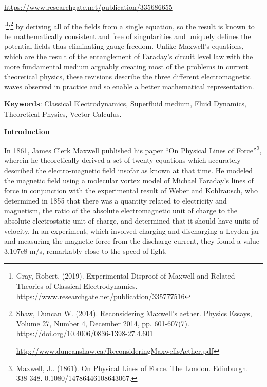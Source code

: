 \documentclass[a4paper]{article}
\newcommand\textstyleInternetlink[1]{#1}
\begin{document}
{{\url{https://www.researchgate.net/publication/335686655}  \par
}{\textsuperscript{,}}\footnote{ Gray, Robert. (2019). Experimental
Disproof of Maxwell and Related Theories of Classical Electrodynamics.
\url{https://www.researchgate.net/publication/335777516}\textstyleInternetlink{ }\par \textstyleInternetlink{
}}{\textsuperscript{,}}\footnote{ 
\href{https://www.ingentaconnect.com/search;jsessionid=9s75nnff84d8s.x-ic-live-02?option2=author&value2=Shaw,+Duncan+W.}{\textstyleInternetlink{Shaw,
Duncan W.}} (2014). Reconsidering Maxwell's aether. Physics Essays, Volume 27, Number 4, December 2014, pp. 601-607(7).
 \url{https://doi.org/10.4006/0836-1398-27.4.601} \par \url{http://www.duncanshaw.ca/ReconsideringMaxwellsAether.pdf}
}{ by deriving all of the fields from a single equation, so the
result is known to be mathematically consistent and free of singularities and uniquely defines the potential fields
thus eliminating gauge freedom. Unlike Maxwell's equations, which are the result of the entanglement of Faraday's
circuit level law with the more fundamental medium arguably creating most of the problems in current theoretical
physics, these revisions describe the three different electromagnetic waves observed in practice and so enable a better
mathematical representation.}}

{
\textbf{{Keywords}}{:
Classical Electrodynamics, Superfluid medium, Fluid Dynamics, Theoretical Physics, Vector Calculus.}}

{\centering\bfseries\color[rgb]{0.101960786,0.101960786,0.101960786}
Introduction
\par}

{
{In 1861, James Clerk Maxwell published his paper ``On Physical
Lines of Force''}\footnote{ Maxwell, J.. (1861). On Physical Lines of Force. The London. Edinburgh. 338-348.
0.1080/14786446108643067. \par }{, wherein he theoretically derived
a set of twenty equations which accurately described the electro-magnetic field insofar as known at that time. He
modeled the magnetic field using a molecular vortex model of Michael Faraday's {\textquotedbl}lines of
force{\textquotedbl} in conjunction with the experimental result
}{of Weber and Kohlrausch, who determined in 1855 that there was a
quantity related to electricity and magnetism, the ratio of the absolute electromagnetic unit of charge to the absolute
electrostatic unit of charge, and determined that it should have units of velocity. In an experiment, which involved
charging and discharging a Leyden jar and measuring the magnetic force from the discharge current, they found a value
3.107e8 m/s, remarkably close to the speed of light.}}
\end{document}
